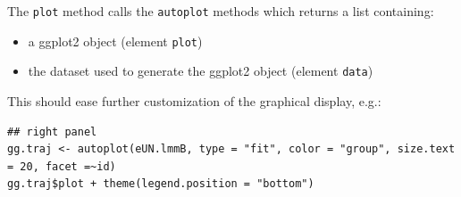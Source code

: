 \documentclass[12pt]{article}
\begin{document}
\clearpage

The \texttt{plot} method calls the \texttt{autoplot} methods which returns a list
containing:
\begin{itemize}
\item a ggplot2 object (element \texttt{plot})
\item the dataset used to generate the ggplot2 object (element \texttt{data})
\end{itemize}
This should ease further customization of the graphical display, e.g.:
\lstset{language=r,label= ,caption= ,captionpos=b,numbers=none}
\begin{lstlisting}
## right panel
gg.traj <- autoplot(eUN.lmmB, type = "fit", color = "group", size.text = 20, facet =~id)
gg.traj$plot + theme(legend.position = "bottom")
\end{lstlisting}
\end{document}
